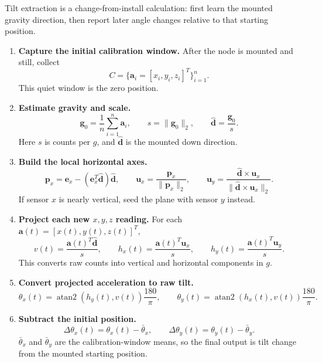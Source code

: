 \documentclass[border=5pt]{standalone}
\begin{document}
\begin{minipage}{6.35in}
\footnotesize
\setlength{\parindent}{0pt}
Tilt extraction is a change-from-install calculation: first learn the mounted
gravity direction, then report later angle changes relative to that starting
position.

\begin{enumerate}[leftmargin=0.23in,itemsep=2pt,topsep=4pt,parsep=0pt]
\item \textbf{Capture the initial calibration window.}
After the node is mounted and still, collect
\[
C=\{\mathbf{a}_i=[x_i,y_i,z_i]^T\}_{i=1}^{n}.
\]
This quiet window is the zero position.

\item \textbf{Estimate gravity and scale.}
\[
\mathbf{g}_0=\frac{1}{n}\sum_{i=1}^{n}\mathbf{a}_i,\qquad
s=\|\mathbf{g}_0\|_2,\qquad
\hat{\mathbf{d}}=\frac{\mathbf{g}_0}{s}.
\]
Here \(s\) is counts per \(g\), and \(\hat{\mathbf{d}}\) is the mounted down direction.

\item \textbf{Build the local horizontal axes.}
\[
\mathbf{p}_x=\mathbf{e}_x-(\mathbf{e}_x^T\hat{\mathbf{d}})\hat{\mathbf{d}},\qquad
\mathbf{u}_x=\frac{\mathbf{p}_x}{\|\mathbf{p}_x\|_2},\qquad
\mathbf{u}_y=\frac{\hat{\mathbf{d}}\times\mathbf{u}_x}
{\|\hat{\mathbf{d}}\times\mathbf{u}_x\|_2}.
\]
If sensor \(x\) is nearly vertical, seed the plane with sensor \(y\) instead.

\item \textbf{Project each new \(x,y,z\) reading.}
For each \(\mathbf{a}(t)=[x(t),y(t),z(t)]^T\),
\[
v(t)=\frac{\mathbf{a}(t)^T\hat{\mathbf{d}}}{s},\qquad
h_x(t)=\frac{\mathbf{a}(t)^T\mathbf{u}_x}{s},\qquad
h_y(t)=\frac{\mathbf{a}(t)^T\mathbf{u}_y}{s}.
\]
This converts raw counts into vertical and horizontal components in \(g\).

\item \textbf{Convert projected acceleration to raw tilt.}
\[
\theta_x(t)=\operatorname{atan2}(h_y(t),v(t))\frac{180}{\pi},\qquad
\theta_y(t)=\operatorname{atan2}(h_x(t),v(t))\frac{180}{\pi}.
\]

\item \textbf{Subtract the initial position.}
\[
\Delta\theta_x(t)=\theta_x(t)-\bar{\theta}_x,\qquad
\Delta\theta_y(t)=\theta_y(t)-\bar{\theta}_y.
\]
\(\bar{\theta}_x\) and \(\bar{\theta}_y\) are the calibration-window means, so the final
output is tilt change from the mounted starting position.
\end{enumerate}
\end{minipage}
\end{document}

